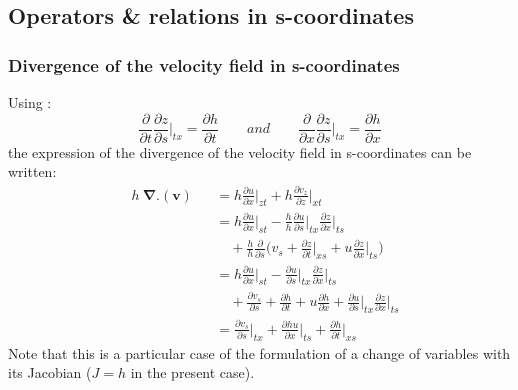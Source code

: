 \subsection{Operators \& relations in s-coordinates}
\label{annexe_s-coord}

\subsubsection{Divergence of the velocity field in s-coordinates}
Using :
\begin{equation}
 \displaystyle
 \frac{\partial}{\partial t} \frac{\partial z}{\partial s}\bigg\vert_{tx}= \frac{\partial h}{\partial t} \qquad and \qquad \frac{\partial}{\partial x} \frac{\partial z}{\partial s}\bigg\vert_{tx}= \frac{\partial h}{\partial x}
\end{equation}
%
the expression of the divergence of the velocity field in s-coordinates can be written:
\begin{subequations}
  \begin{alignat}{2}
  & h \ \mathbf{\nabla}.( \mathbf v) &&= h \frac{\partial u}{\partial x} \bigg \rvert_{zt} +h \frac{\partial v_z}{\partial z} \bigg \rvert_{xt}\\[4mm]
  & && = h \frac{\partial u}{\partial x} \bigg \rvert_{st} - \frac{h}{h} \frac{\partial u}{\partial s}\bigg \rvert_{tx} \frac{\partial z}{\partial x}\bigg \rvert_{ts} \\[4mm]
  & && \quad + \frac{h}{h}  \frac{\partial}{\partial s} \bigg ( v_s + \frac{\partial z }{\partial t}\bigg \rvert_{xs} + u \frac{\partial z}{\partial x}\bigg \rvert_{ts} \bigg )\\[4mm]
  & && = h \frac{\partial u}{\partial x} \bigg \rvert_{st} -  \frac{\partial u}{\partial s}\bigg \rvert_{tx} \frac{\partial z}{\partial x}\bigg \rvert_{ts} \\[4mm]
  & && \quad +  \frac{\partial v_s}{\partial s} +  \frac{\partial h}{\partial t} + u \frac{\partial h}{\partial x} + \frac{\partial u}{\partial s}\bigg \rvert_{tx} \frac{\partial z}{\partial x}\bigg \rvert_{ts}\\[4mm]
  & && = \frac{\partial v_s}{\partial s}\bigg \rvert_{tx} + \frac{\partial h u}{\partial x} \bigg \rvert_{ts}+ \frac{\partial h}{\partial t}\bigg \rvert_{xs}
  \end{alignat}
\end{subequations}
Note that this is a particular case of the formulation of a change of variables with its Jacobian ($J=h$ in the present case). %
%
